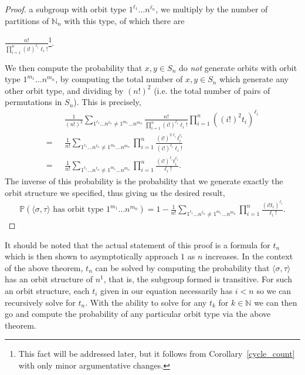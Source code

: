\begin{proof}
  a subgroup with orbit type $1^{\ell_1}\dots n^{\ell_n}$, we
  multiply by the number of partitions of $\mathbb{N}_n$ with this
  type, of which there are
  \begin{center}
    $\frac{n!}{\prod_{i=1}^n{(i!)^{\ell_i}\ell_i!}}$\footnote{This
      fact will be addressed later, but it follows from
    Corollary~\ref{cycle_count} with only minor argumentative changes.}.
  \end{center}
  We then compute the probability that $x,y\in S_n$ do \emph{not} generate
  orbits with orbit type $1^{m_1}\dots n^{m_n} $, by computing the
  total number of $x,y\in S_n$ which generate any other orbit
  type, and dividing by $(n!)^2$ (i.e. the total number of pairs
  of permutations in $S_n$). This is precisely,
  \begin{align*}
    & {\frac{1}{(n!)^2}\sum_{1^{\ell_1}\dots n^{\ell_n} \ne 1^{m_1}\dots
    n^{m_n}}\frac{n!}{\prod_{i=1}^n{(i!)^{\ell_i}\ell_i!}}}\prod_{i=1}^n{((i!)^2t_i)^{\ell_i}}
    \\
    =\text{ } & \frac{1}{n!}\sum_{1^{\ell_1}\dots n^{\ell_n} \ne
      1^{m_1}\dots
    n^{m_n}}{\prod_{i=1}^n{\frac{(i!)^{2\ell_i}t_i^{\ell_i}}{(i!)^{\ell_i}\ell_i!}}}
    \\
    =\text{ } & \frac{1}{n!}\sum_{1^{\ell_1}\dots n^{\ell_n} \ne
    1^{m_1}\dots n^{m_n}}{\prod_{i=1}^n{\frac{(i!)^{\ell_i}t_i^{\ell_i}}{
    \ell_i!}}}.
  \end{align*}
  The inverse of this probability is the probability that we
  generate exactly the orbit structure we specified, thus giving us
  the desired result,
  \begin{align*}
    \mathbb{P}(\langle\sigma,\tau\rangle\text{ has orbit type
    }1^{m_1}\dots n^{m_n}) = 1-\frac{1}{n!}\sum_{1^{\ell_1}\dots
      n^{\ell_n} \ne 1^{m_1}\dots
    n^{m_n}}\prod_{i=1}^n{\frac{(i!t_{i})^{\ell_i}}{\ell_i!}}.
  \end{align*}
\end{proof}
\noindent It should be noted that the actual statement of this proof
is a formula for $t_n$ which is then shown to asymptotically approach
$1$ as $n$ increases. In the context of the above theorem, $t_n$ can
be solved by computing the probability that $\langle \sigma,
\tau\rangle$ has an orbit structure of $n^1$, that is, the subgroup
formed is transitive. For such an orbit structure, each $t_i$ given
in our equation necessarily has $i < n$ so we can recursively solve
for $t_n$. With the ability to solve for any $t_k$ for
$k\in\mathbb{N}$ we can then go and compute the probability of any
particular orbit type via the above theorem.
